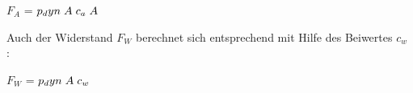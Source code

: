 \documentclass{article}
\begin{document}
\vspace{3 mm}
$F_A$ \hspace{1 mm} = \hspace{1 mm} $p_dyn\hspace{1 mm}A\hspace{1 mm}c_a\hspace{1 mm}A$ 


\vspace{3 mm}
Auch der Widerstand $F_W$ berechnet sich entsprechend mit Hilfe des Beiwertes $c_w$ : 


\vspace{3 mm}
$F_W$ \hspace{1 mm} = \hspace{1 mm} $p_dyn\hspace{1 mm}A\hspace{1 mm}c_w$ 


\vspace{3 mm}
\end{document}
